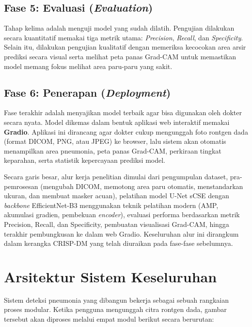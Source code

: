\documentclass[12pt,a4paper,oneside]{book}
\begin{document}
\subsection{Fase 5: Evaluasi (\textit{Evaluation})}

Tahap kelima adalah menguji model yang sudah dilatih. Pengujian dilakukan secara kuantitatif memakai tiga metrik utama: \textit{Precision}, \textit{Recall}, dan \textit{Specificity}. Selain itu, dilakukan pengujian kualitatif dengan memeriksa kecocokan area arsir prediksi secara visual serta melihat peta panas Grad-CAM untuk memastikan model memang fokus melihat area paru-paru yang sakit.

\subsection{Fase 6: Penerapan (\textit{Deployment})}

Fase terakhir adalah menyajikan model terbaik agar bisa digunakan oleh dokter secara nyata. Model dikemas dalam bentuk aplikasi web interaktif memakai \textbf{Gradio}. Aplikasi ini dirancang agar dokter cukup mengunggah foto rontgen dada (format DICOM, PNG, atau JPEG) ke browser, lalu sistem akan otomatis menampilkan area pneumonia, peta panas Grad-CAM, perkiraan tingkat keparahan, serta statistik kepercayaan prediksi model.

Secara garis besar, alur kerja penelitian dimulai dari pengumpulan dataset, pra-pemrosesan (mengubah DICOM, memotong area paru otomatis, menstandarkan ukuran, dan membuat masker acuan), pelatihan model U-Net sCSE dengan \textit{backbone} EfficientNet-B3 menggunakan teknik pelatihan modern (AMP, akumulasi gradien, pembekuan \textit{encoder}), evaluasi performa berdasarkan metrik Precision, Recall, dan Specificity, pembuatan visualisasi Grad-CAM, hingga terakhir pembungkusan ke dalam web Gradio. Keseluruhan alur ini dirangkum dalam kerangka CRISP-DM yang telah diuraikan pada fase-fase sebelumnya.

\section{Arsitektur Sistem Keseluruhan}

Sistem deteksi pneumonia yang dibangun bekerja sebagai sebuah rangkaian proses modular. Ketika pengguna mengunggah citra rontgen dada, gambar tersebut akan diproses melalui empat modul berikut secara berurutan:
\end{document}
